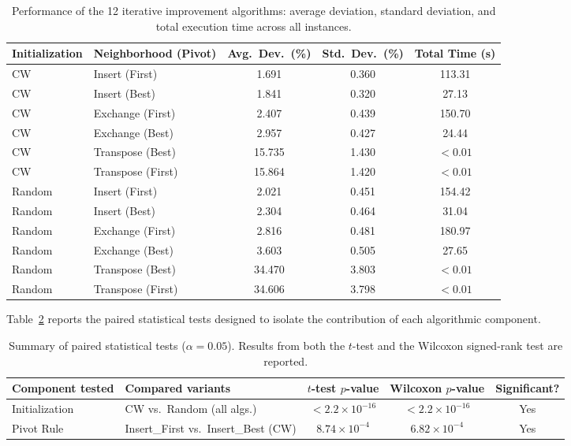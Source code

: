 \documentclass[11pt, a4paper]{article}
\begin{document}
\begin{table}[h]
\centering
\caption{Performance of the 12 iterative improvement algorithms: average deviation, standard deviation, and total execution time across all instances.}
\label{tab:results}
\begin{tabular}{llccc}
\toprule
\textbf{Initialization} & \textbf{Neighborhood (Pivot)} & \textbf{Avg.\ Dev.\ (\%)} & \textbf{Std.\ Dev.\ (\%)} & \textbf{Total Time (s)} \\
\midrule
CW     & Insert (First)    & 1.691 & 0.360 & 113.31 \\
CW     & Insert (Best)     & 1.841 & 0.320 & 27.13  \\
CW     & Exchange (First)  & 2.407 & 0.439 & 150.70 \\
CW     & Exchange (Best)   & 2.957 & 0.427 & 24.44  \\
CW     & Transpose (Best)  & 15.735 & 1.430 & $<0.01$ \\
CW     & Transpose (First) & 15.864 & 1.420 & $<0.01$ \\
\midrule
Random & Insert (First)    & 2.021 & 0.451 & 154.42 \\
Random & Insert (Best)     & 2.304 & 0.464 & 31.04  \\
Random & Exchange (First)  & 2.816 & 0.481 & 180.97 \\
Random & Exchange (Best)   & 3.603 & 0.505 & 27.65  \\
Random & Transpose (Best)  & 34.470 & 3.803 & $<0.01$ \\
Random & Transpose (First) & 34.606 & 3.798 & $<0.01$ \\
\bottomrule
\end{tabular}
\end{table}

Table~\ref{tab:tests} reports the paired statistical tests designed to isolate the contribution of each algorithmic component.

\begin{table}[h]
\centering
\caption{Summary of paired statistical tests ($\alpha = 0.05$). Results from both the $t$-test and the Wilcoxon signed-rank test are reported.}
\label{tab:tests}
\begin{tabular}{l p{5cm} ccc}
\toprule
\textbf{Component tested} & \textbf{Compared variants} & \textbf{$t$-test $p$-value} & \textbf{Wilcoxon $p$-value} & \textbf{Significant?} \\
\midrule
Initialization   & CW vs.\ Random (all algs.)  & $< 2.2 \times 10^{-16}$ & $< 2.2 \times 10^{-16}$ & Yes \\
Pivot Rule       & Insert\_First vs.\ Insert\_Best (CW) & $8.74 \times 10^{-4}$ & $6.82 \times 10^{-4}$ & Yes \\
\bottomrule
\end{tabular}
\end{table}
\end{document}
